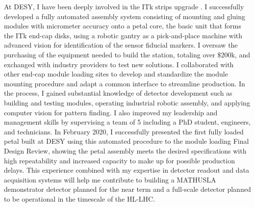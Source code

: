 \documentclass[a4paper]{article}
\begin{document}
\bigskip

At DESY, I have been deeply involved in the ITk strips upgrade \cite{ITKstrips}. I successfully developed a fully automated assembly system consisting of mounting and gluing modules with micrometer accuracy onto a petal core, the basic unit that forms the ITk end-cap disks, using a robotic gantry as a pick-and-place machine with advanced vision for identification of the sensor fiducial markers. I oversaw the purchasing of the equipment needed to build the station, totaling over $\$200$k, and exchanged with industry providers to test new solutions. I collaborated with other end-cap module loading sites to develop and standardize the module mounting procedure and adapt a common interface to streamline production. In the process, I gained substantial knowledge of detector development such as building and testing modules, operating industrial robotic assembly, and applying computer vision for pattern finding. I also improved my leadership and management skills by supervising a team of 5 including a PhD student, engineers, and technicians. In February 2020, I successfully presented the first fully loaded petal built at DESY using this automated procedure to the module loading Final Design Review, showing the petal assembly meets the desired specifications with high repeatability and increased capacity to make up for possible production delays. This experience combined with my expertise in detector readout and data acquisition systems will help me contribute to building a MATHUSLA demonstrator detector planned for the near term and a full-scale detector planned to be operational in the timescale of the HL-LHC.

\bigskip
\end{document}

